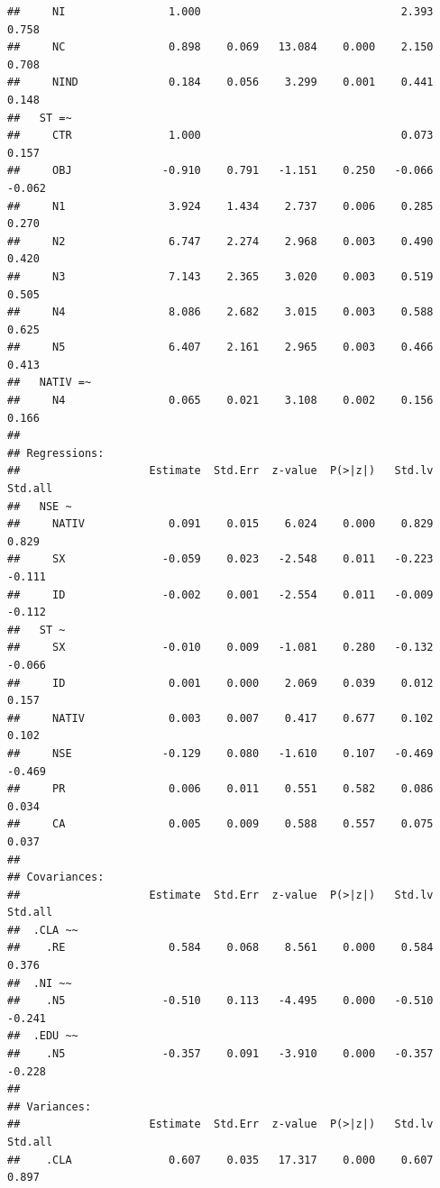 \documentclass[
  12pt,
]{article}
\begin{document}
\begin{verbatim}
##     NI                1.000                               2.393    0.758
##     NC                0.898    0.069   13.084    0.000    2.150    0.708
##     NIND              0.184    0.056    3.299    0.001    0.441    0.148
##   ST =~                                                                 
##     CTR               1.000                               0.073    0.157
##     OBJ              -0.910    0.791   -1.151    0.250   -0.066   -0.062
##     N1                3.924    1.434    2.737    0.006    0.285    0.270
##     N2                6.747    2.274    2.968    0.003    0.490    0.420
##     N3                7.143    2.365    3.020    0.003    0.519    0.505
##     N4                8.086    2.682    3.015    0.003    0.588    0.625
##     N5                6.407    2.161    2.965    0.003    0.466    0.413
##   NATIV =~                                                              
##     N4                0.065    0.021    3.108    0.002    0.156    0.166
## 
## Regressions:
##                    Estimate  Std.Err  z-value  P(>|z|)   Std.lv  Std.all
##   NSE ~                                                                 
##     NATIV             0.091    0.015    6.024    0.000    0.829    0.829
##     SX               -0.059    0.023   -2.548    0.011   -0.223   -0.111
##     ID               -0.002    0.001   -2.554    0.011   -0.009   -0.112
##   ST ~                                                                  
##     SX               -0.010    0.009   -1.081    0.280   -0.132   -0.066
##     ID                0.001    0.000    2.069    0.039    0.012    0.157
##     NATIV             0.003    0.007    0.417    0.677    0.102    0.102
##     NSE              -0.129    0.080   -1.610    0.107   -0.469   -0.469
##     PR                0.006    0.011    0.551    0.582    0.086    0.034
##     CA                0.005    0.009    0.588    0.557    0.075    0.037
## 
## Covariances:
##                    Estimate  Std.Err  z-value  P(>|z|)   Std.lv  Std.all
##  .CLA ~~                                                                
##    .RE                0.584    0.068    8.561    0.000    0.584    0.376
##  .NI ~~                                                                 
##    .N5               -0.510    0.113   -4.495    0.000   -0.510   -0.241
##  .EDU ~~                                                                
##    .N5               -0.357    0.091   -3.910    0.000   -0.357   -0.228
## 
## Variances:
##                    Estimate  Std.Err  z-value  P(>|z|)   Std.lv  Std.all
##    .CLA               0.607    0.035   17.317    0.000    0.607    0.897

\end{verbatim}
\end{document}
